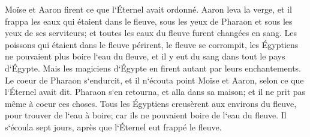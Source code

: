 \verse Moïse et Aaron firent ce que l`Éternel avait ordonné. Aaron leva la verge, et il frappa les eaux qui étaient dans le fleuve, sous les yeux de Pharaon et sous les yeux de ses serviteurs; et toutes les eaux du fleuve furent changées en sang. 
\verse Les poissons qui étaient dans le fleuve périrent, le fleuve se corrompit, les Égyptiens ne pouvaient plus boire l`eau du fleuve, et il y eut du sang dans tout le pays d`Égypte. 
\verse Mais les magiciens d`Égypte en firent autant par leurs enchantements. Le coeur de Pharaon s`endurcit, et il n`écouta point Moïse et Aaron, selon ce que l`Éternel avait dit. 
\verse Pharaon s`en retourna, et alla dans sa maison; et il ne prit pas même à coeur ces choses. 
\verse Tous les Égyptiens creusèrent aux environs du fleuve, pour trouver de l`eau à boire; car ils ne pouvaient boire de l`eau du fleuve. 
\verse Il s`écoula sept jours, après que l`Éternel eut frappé le fleuve. 

\chapter{}

